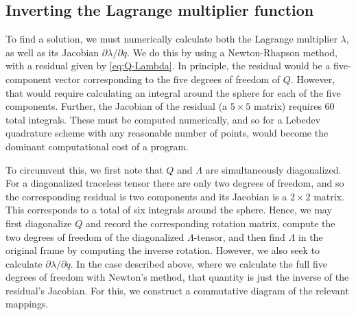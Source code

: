 \documentclass[reqno]{article}
\begin{document}
  \subsection{Inverting the Lagrange multiplier function}
  To find a solution, we must numerically calculate both the Lagrange multiplier
  $\lambda$, as well as its Jacobian $\partial \lambda/ \partial q$.
  We do this by using a Newton-Rhapson method, with a residual given by \eqref{eq:Q-Lambda}.
  In principle, the residual would be a five-component vector corresponding to
  the five degrees of freedom of $Q$.
  However, that would require calculating an integral around the sphere for each
  of the five components.
  Further, the Jacobian of the residual (a $5\times 5$ matrix) requires 60 total integrals.
  These must be computed numerically, and so for a Lebedev quadrature scheme
  with any reasonable number of points, would become the dominant computational
  cost of a program.

  To circumvent this, we first note that $Q$ and $\Lambda$ are simultaneously
  diagonalized.
  For a diagonalized traceless tensor there are only two degrees of
  freedom, and so the corresponding residual is two components and its Jacobian
  is a $2\times 2$ matrix.
  This corresponds to a total of six integrals around the sphere.
  Hence, we may first diagonalize $Q$ and record the corresponding rotation
  matrix, compute the two degrees of freedom of the diagonalized
  $\Lambda$-tensor, and then find $\Lambda$ in the original frame by computing
  the inverse rotation.
  However, we also seek to calculate $\partial \lambda/\partial q$.
  In the case described above, where we calculate the full five degrees of
  freedom with Newton's method, that quantity is just the inverse of the
  residual's Jacobian.
  For this, we construct a commutative diagram of the relevant mappings.
\end{document}
